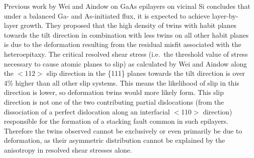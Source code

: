 Previous work by Wei and Aindow\cite{Wei1994} on GaAs epilayers on vicinal Si concludes that under a balanced Ga- and As-initiated flux, it is expected to achieve layer-by-layer growth.
They proposed that the high density of twins with habit planes towards the tilt direction in combination with less twins on all other habit planes is due to the deformation resulting from the residual misfit associated with the heteroepitaxy.
The critical resolved shear stress (i.e.\ the threshold value of stress necessary to cause atomic planes to slip) as calculated by Wei and Aindow\cite{Wei1994} along the \(<\)112\(>\) slip direction in the \{111\} planes towards the tilt direction is over 4\% higher than all other slip systems.
This means the likelihood of slip in this direction is lower, so deformation twins would more likely form.
This slip direction is not one of the two contributing partial dislocations (from the dissociation of a perfect dislocation along an interfacial \(<\)110\(>\) direction) responsible for the formation of a stacking fault common in such epilayers.
Therefore the twins observed cannot be exclusively or even primarily be due to deformation, as their asymmetric distribution cannot be explained by the anisotropy in resolved shear stresses alone.

